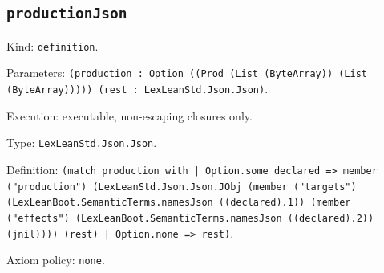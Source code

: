 \documentclass[11pt]{article}
\begin{document}
\subsection*{\texttt{productionJson}}
\noindent Kind: \texttt{definition}.\par
\noindent Parameters: \texttt{(production : Option ((Prod (List (ByteArray)) (List (ByteArray))))) (rest : LexLeanStd.Json.Json)}.\par
\noindent Execution: executable, non-escaping closures only.\par
\noindent Type: \texttt{LexLeanStd.Json.Json}.\par
\noindent Definition: \texttt{(match production with | Option.some declared => member ("production") (LexLeanStd.Json.Json.JObj (member ("targets") (LexLeanBoot.SemanticTerms.namesJson ((declared).1)) (member ("effects") (LexLeanBoot.SemanticTerms.namesJson ((declared).2)) (jnil)))) (rest) | Option.none => rest)}.\par
\noindent Axiom policy: \texttt{none}.\par
\end{document}

